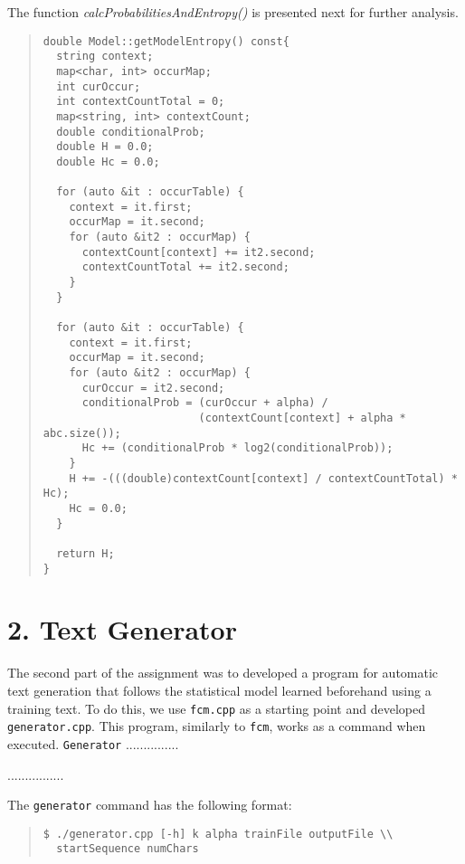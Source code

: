 \documentclass[12pt]{article}
\begin{document}
The function {\it calcProbabilitiesAndEntropy()\/} is presented next for further
analysis.

\begingroup
\addtolength\leftmargini{-0.4in}
\addtolength\baselineskip{-0.05in}
\begin{quote}
\begin{verbatim}
double Model::getModelEntropy() const{
  string context;
  map<char, int> occurMap;
  int curOccur;
  int contextCountTotal = 0;
  map<string, int> contextCount;
  double conditionalProb;
  double H = 0.0;
  double Hc = 0.0;

  for (auto &it : occurTable) {
    context = it.first;
    occurMap = it.second;
    for (auto &it2 : occurMap) {
      contextCount[context] += it2.second;
      contextCountTotal += it2.second;
    }
  }

  for (auto &it : occurTable) {
    context = it.first;
    occurMap = it.second; 
    for (auto &it2 : occurMap) {
      curOccur = it2.second;
      conditionalProb = (curOccur + alpha) /
                        (contextCount[context] + alpha * abc.size());
      Hc += (conditionalProb * log2(conditionalProb));
    }
    H += -(((double)contextCount[context] / contextCountTotal) * Hc);
    Hc = 0.0;
  }

  return H; 
}
\end{verbatim}
\end{quote}
\endgroup
\newpage

\section*{2. Text Generator}

The second part of the assignment was to developed a program for automatic
text generation that follows the statistical model learned beforehand using 
a training text.
To do this, we use \texttt{fcm.cpp} as a starting point and developed 
\texttt{generator.cpp}. 
This program, similarly to \texttt{fcm}, works as a command when executed.
\texttt{Generator} ...............

................

The \texttt{generator} command has the following format: 

\begin{quote}
\begin{verbatim}
$ ./generator.cpp [-h] k alpha trainFile outputFile \\
  startSequence numChars 
\end{verbatim}
\end{quote}
\end{document}
